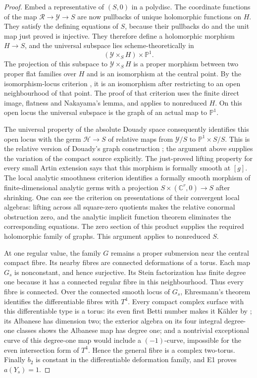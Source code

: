 \begin{proof}
Embed a representative of $(S,0)$ in a polydisc. The coordinate
functions of the map $\mathcal R\to\mathcal Y\to S$ are now
pullbacks of unique holomorphic functions on $H$. They satisfy
the defining equations of $S$, because their pullbacks do and the
unit map just proved is injective. They therefore define a
holomorphic morphism $H\to S$, and the universal subspace lies
scheme-theoretically in
\[
 (\mathcal Y\times_S H)\times\mathbb P^1.
\]
The projection of this subspace to $\mathcal Y\times_S H$ is a
proper morphism between two proper flat families over $H$ and
is an isomorphism at the central point. By the isomorphism-locus
criterion \cite[Section~10.1, Proposition~1, p.~86]{Douady1966},
it is an isomorphism after restricting to an open neighbourhood
of that point. The proof of that criterion uses the finite
direct image, flatness and Nakayama's lemma, and applies to
nonreduced $H$. On this open locus the universal subspace is
the graph of an actual map to $\mathbb P^1$.

The universal property of the absolute Douady space consequently
identifies this open locus with the germ $\mathcal H\to S$ of
relative maps from $\mathcal Y/S$ to
$\mathbb P^1\times S/S$. This is the relative version of
Douady's graph construction
\cite[Section~10.2, Theorem~1, p.~87]{Douady1966}; the argument
above supplies the variation of the compact source explicitly.
The just-proved lifting property for every
small Artin extension says that this morphism is formally smooth
at $[g]$. The local analytic smoothness criterion identifies a
formally smooth morphism of finite-dimensional analytic germs with
a projection $S\times(\mathbb C^r,0)\to S$ after shrinking. One
can see the criterion on presentations of their convergent local
algebras: lifting across all square-zero quotients makes the
relative conormal obstruction zero, and the analytic implicit
function theorem eliminates the corresponding equations. The
zero section of this product supplies the required holomorphic
family of graphs. This argument applies to nonreduced $S$.

At one regular value, the family $G$ remains a proper submersion
near the central compact fibre. Its nearby fibres are connected
deformations of a torus. Each map $G_s$ is nonconstant, and hence
surjective. Its Stein factorization has finite degree one because
it has a connected regular fibre in this neighbourhood. Thus
every fibre is connected. Over the connected smooth locus of
$G_s$, Ehresmann's theorem identifies the differentiable fibres
with $T^4$. Every compact complex surface with this differentiable
type is a torus: its even first Betti number makes it K\"ahler
by \cite[Theorem 11]{Buchdahl1999};
its Albanese has dimension two; the exterior algebra on its four
integral degree-one classes shows the Albanese map has degree one;
and a nontrivial exceptional curve of this degree-one map would
include a $(-1)$-curve, impossible for the even intersection form
of $T^4$. Hence the general fibre is a complex two-torus.
Finally $b_2$ is constant in the differentiable deformation family,
and E1 proves $a(Y_s)=1$.
\end{proof}
